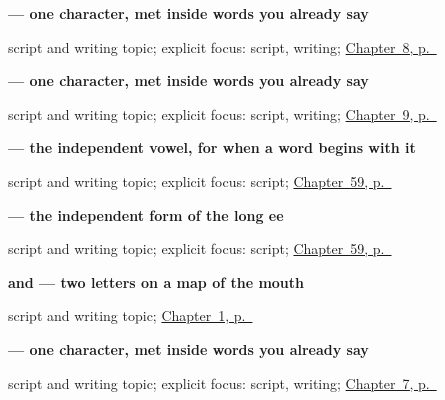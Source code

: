 \noindent\begin{minipage}[t]{\linewidth}
\raggedright
\textbf{ — one character, met inside words you already say}\par
\footnotesize script and writing topic; explicit focus: script, writing; \hyperref[ch:hi-please]{Chapter~8, p.~\pageref*{ch:hi-please}}
\end{minipage}\par\smallskip

\noindent\begin{minipage}[t]{\linewidth}
\raggedright
\textbf{ — one character, met inside words you already say}\par
\footnotesize script and writing topic; explicit focus: script, writing; \hyperref[ch:hi-sorry]{Chapter~9, p.~\pageref*{ch:hi-sorry}}
\end{minipage}\par\smallskip

\noindent\begin{minipage}[t]{\linewidth}
\raggedright
\textbf{ — the independent vowel, for when a word begins with it}\par
\footnotesize script and writing topic; explicit focus: script; \hyperref[ch:hi-script-second-wave]{Chapter~59, p.~\pageref*{ch:hi-script-second-wave}}
\end{minipage}\par\smallskip

\noindent\begin{minipage}[t]{\linewidth}
\raggedright
\textbf{ — the independent form of the long ee}\par
\footnotesize script and writing topic; explicit focus: script; \hyperref[ch:hi-script-second-wave]{Chapter~59, p.~\pageref*{ch:hi-script-second-wave}}
\end{minipage}\par\smallskip

\noindent\begin{minipage}[t]{\linewidth}
\raggedright
\textbf{ and  — two letters on a map of the mouth}\par
\footnotesize script and writing topic; \hyperref[ch:greetings]{Chapter~1, p.~\pageref*{ch:greetings}}
\end{minipage}\par\smallskip

\noindent\begin{minipage}[t]{\linewidth}
\raggedright
\textbf{ — one character, met inside words you already say}\par
\footnotesize script and writing topic; explicit focus: script, writing; \hyperref[ch:hi-yes-and-no]{Chapter~7, p.~\pageref*{ch:hi-yes-and-no}}
\end{minipage}\par\smallskip

